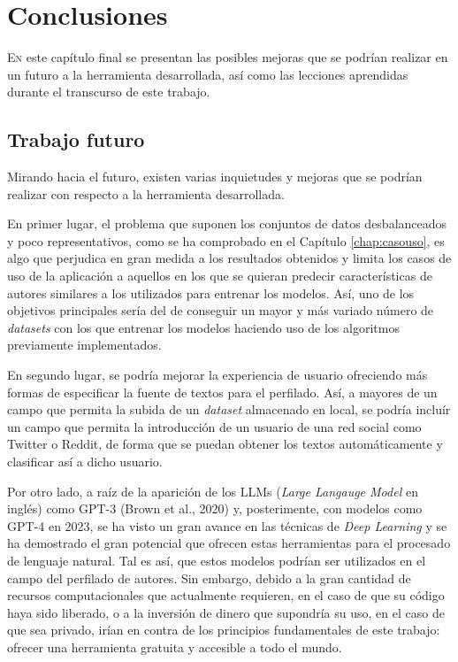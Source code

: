 \chapter{Conclusiones}
\label{chap:conclusiones}

{
	\color{blue}
\lettrine{E}{n} este capítulo final se presentan las posibles mejoras que se podrían realizar en un futuro a la herramienta desarrollada,
así como las lecciones aprendidas durante el transcurso de este trabajo.


\section{Trabajo futuro}
\label{sec:trabajo_futuro}

Mirando hacia el futuro, existen varias inquietudes y mejoras que se podrían realizar con respecto a la herramienta desarrollada.

\bigskip
En primer lugar, el problema que suponen los conjuntos de datos desbalanceados y poco representativos, como se ha comprobado en el Capítulo \ref{chap:casouso},
es algo que perjudica en gran medida a los resultados obtenidos y limita los casos de uso de la aplicación a aquellos en los que se quieran predecir características
de autores similares a los utilizados para entrenar los modelos. Así, uno de los objetivos principales sería del de conseguir un mayor y más variado número de \textit{datasets}
con los que entrenar los modelos haciendo uso de los algoritmos previamente implementados.

\bigskip
En segundo lugar, se podría mejorar la experiencia de usuario ofreciendo más formas de especificar la fuente de textos para el perfilado.
Así, a mayores de un campo que permita la subida de un \textit{dataset} almacenado en local, se podría incluír un campo que permita la introducción
de un usuario de una red social como Twitter o Reddit, de forma que se puedan obtener los textos automáticamente y clasificar así a dicho usuario.

\bigskip
Por otro lado, a raíz de la aparición de los LLMs (\textit{Large Langauge Model} en inglés) como GPT-3 (Brown et al., 2020) \cite{brown2020language}
y, posterimente, con modelos como GPT-4 en 2023, se ha visto un gran avance en las técnicas de \textit{Deep Learning}
y se ha demostrado el gran potencial que ofrecen estas herramientas para el procesado de lenguaje natural. Tal es así, que estos modelos
podrían ser utilizados en el campo del perfilado de autores. Sin embargo, debido a la gran cantidad de recursos
computacionales que actualmente requieren, en el caso de que su código haya sido liberado, o a la inversión de dinero que supondría su uso, en el caso
de que sea privado, irían en contra de los principios fundamentales de este trabajo: ofrecer una herramienta gratuita
y accesible a todo el mundo.

}
